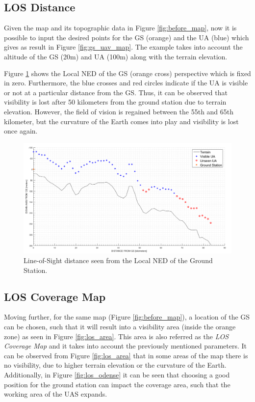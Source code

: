 \subsection{LOS Distance}
Given the map and its topographic data in Figure \ref{fig:before_map}, now it is possible to input the desired points for the GS (orange) and the UA (blue) which gives as result in Figure \ref{fig:gs_uav_map}. The example takes into account the altitude of the GS (20m) and UA (100m) along with the terrain elevation. 

Figure \ref{fig:los_2p} shows the Local NED of the GS (orange cross) perspective which is fixed in zero. Furthermore, the blue crosses and red circles indicate if the UA is visible or not at a particular distance from the GS. Thus, it can be observed that visibility is lost after 50 kilometers from the ground station due to terrain elevation. However, the field of vision is regained between the 55th and 65th kilometer, but the curvature of the Earth comes into play and visibility is lost once again.

\begin{figure}[H]
	\centering
	\includegraphics[scale=0.40]{figures/los_2points.png}
	\caption{Line-of-Sight distance seen from the Local NED of the Ground Station.}
   	\label{fig:los_2p}
\end{figure}

\subsection{LOS Coverage Map}
Moving further, for the same map (Figure \ref{fig:before_map}), a location of the GS can be chosen, such that it will result into a visibility area (inside the orange zone) as seen in Figure \ref{fig:los_area}. This area is also referred as the \emph{LOS Coverage Map} and it takes into account the previously mentioned parameters.
It can be observed from Figure \ref{fig:los_area} that in some areas of the map there is no visibility, due to higher terrain elevation or the curvature of the Earth. Additionally, in Figure \ref{fig:los_odense} it can be seen that choosing a good position for the ground station can impact the coverage area, such that the working area of the UAS expands. 

